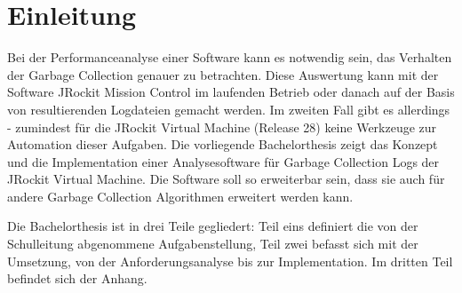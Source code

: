 \chapter*{Einleitung}
Bei der Performanceanalyse einer Software kann es notwendig sein, das  Verhalten der Garbage Collection genauer zu betrachten. Diese Auswertung kann mit der Software JRockit Mission Control im laufenden Betrieb oder danach auf der Basis von resultierenden Logdateien gemacht werden. Im zweiten Fall gibt es allerdings - zumindest für die JRockit Virtual Machine (Release 28) keine Werkzeuge zur Automation dieser Aufgaben. Die vorliegende Bachelorthesis zeigt das Konzept und die Implementation einer Analysesoftware für Garbage Collection Logs der JRockit Virtual Machine. Die Software soll so erweiterbar sein, dass sie auch für andere Garbage Collection Algorithmen erweitert werden kann.

Die Bachelorthesis ist in drei Teile gegliedert: Teil eins definiert die von der Schulleitung abgenommene Aufgabenstellung, Teil zwei befasst sich mit der Umsetzung, von der Anforderungsanalyse bis zur Implementation. Im dritten Teil befindet sich der Anhang.
